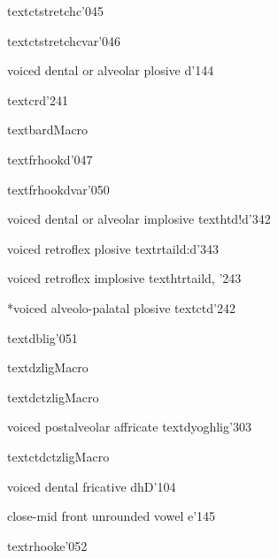 %
  {}%
  {\tbs textctstretchc}{}{\PSG}{'045}

%
  {}%
  {\tbs textctstretchcvar}{}{\cite{Hottentot}}{'046}

%
  {voiced dental or alveolar plosive}%
  {d}{}{\ipaall}{'144}

%
  {}%
  {\tbs textcrd}{}{\PSG}{'241}

%
  {}%
  {\tbs textbard}{}{\PSG}{Macro}

%
  {}%
  {\tbs textfrhookd}{}{\PSG}{'047}

%
  {}%
  {\tbs textfrhookdvar}{}{}{'050}%

%
  {voiced dental or alveolar implosive}%
  {\tbs texthtd}{\tbs!d}{\ipaall}{'342}

%
  {voiced retroflex plosive}%
  {\tbs textrtaild}{\tbs:d}{\ipaall}{'343}

%
  {voiced retroflex implosive}%
  {\tbs texthtrtaild}{}{\PSG, \Handbook}{'243}

%
  {*voiced alveolo-palatal plosive}%
  {\tbs textctd}{}{}{'242}

%
  {}%
  {\tbs textdblig}{}{\PSG}{'051}

%
  {}%
  {\tbs textdzlig}{}{\PSG}{Macro}

%
  {}%
  {\tbs textdctzlig}{}{}{Macro}

%
  {voiced postalveolar affricate}%
  {\tbs textdyoghlig}{}{\ipaall}{'303}

%
  {}%
  {\tbs textctdctzlig}{}{}{Macro}

%
  {voiced dental fricative}%
  {\tbs dh}{D}{\ipaall}{'104}

%
  {close-mid front unrounded vowel}%
  {e}{}{\ipaall}{'145}

%
  {}%
  {\tbs textrhooke}{}{\PSG}{'052}

